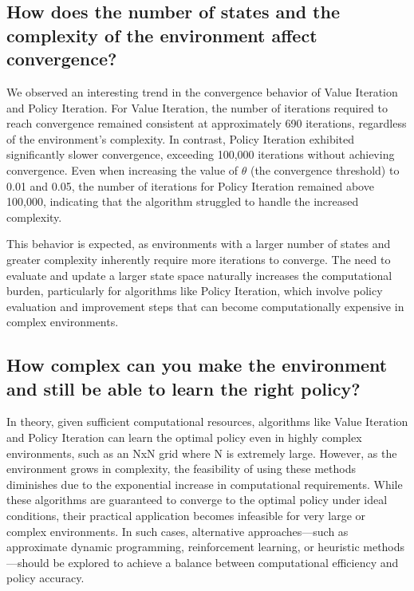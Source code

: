 \subsection{How does the number of states and the complexity of the environment affect convergence?}

We observed an interesting trend in the convergence behavior of Value Iteration and Policy Iteration. For Value Iteration, the number of iterations required to reach convergence remained consistent at approximately 690 iterations, regardless of the environment's complexity. In contrast, Policy Iteration exhibited significantly slower convergence, exceeding 100,000 iterations without achieving convergence. Even when increasing the value of $\theta$ (the convergence threshold) to 0.01 and 0.05, the number of iterations for Policy Iteration remained above 100,000, indicating that the algorithm struggled to handle the increased complexity. \vspace{10pt}

\noindent This behavior is expected, as environments with a larger number of states and greater complexity inherently require more iterations to converge. The need to evaluate and update a larger state space naturally increases the computational burden, particularly for algorithms like Policy Iteration, which involve policy evaluation and improvement steps that can become computationally expensive in complex environments.

\subsection{How complex can you make the environment and still be able to learn the right policy?}

In theory, given sufficient computational resources, algorithms like Value Iteration and Policy Iteration can learn the optimal policy even in highly complex environments, such as an NxN grid where N is extremely large. However, as the environment grows in complexity, the feasibility of using these methods diminishes due to the exponential increase in computational requirements. While these algorithms are guaranteed to converge to the optimal policy under ideal conditions, their practical application becomes infeasible for very large or complex environments. In such cases, alternative approaches—such as approximate dynamic programming, reinforcement learning, or heuristic methods—should be explored to achieve a balance between computational efficiency and policy accuracy.
